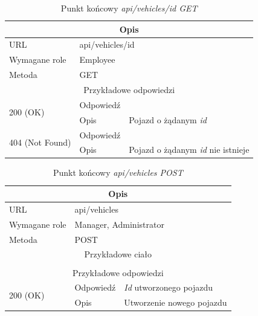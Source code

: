 \documentclass[eng,printmode,openany]{mgr}
\begin{document}
\begin{table}[H]
	\caption{Punkt końcowy \textit{api/vehicles/id GET}}
	\begin{tabularx}{\textwidth}{|l|l|X|}
		\hline
		\multicolumn{3}{|c|}{Opis}                         						\\ \hline
		URL                       & \multicolumn{2}{l|}{api/vehicles/id} 		\\ \hline
		Wymagane role             & \multicolumn{2}{l|}{Employee} 				\\ \hline
		Metoda                    & \multicolumn{2}{l|}{GET} 					\\ \hline
		\multicolumn{3}{|c|}{ Przykładowe odpowiedzi}                   		\\ \hline
		\multirow{2}{*}{200 (OK)} 			& Odpowiedź    	&        \\ \cline{2-3} 
		& Opis         	& Pojazd o żądanym \textit{id}      									\\ \hline
		\multirow{2}{*}{404 (Not Found)} 	& Odpowiedź     &    \\ \cline{2-3} 
		& Opis          & Pojazd o żądanym \textit{id} nie istnieje      						\\ \hline
	\end{tabularx}
\end{table}

\begin{table}[H]
	\caption{Punkt końcowy \textit{api/vehicles POST}}
	\begin{tabularx}{\textwidth}{|l|l|X|}
		\hline
		\multicolumn{3}{|c|}{Opis}                         						\\ \hline
		URL                       & \multicolumn{2}{l|}{api/vehicles} 			\\ \hline
		Wymagane role             & \multicolumn{2}{l|}{Manager, Administrator} \\ \hline
		Metoda                    & \multicolumn{2}{l|}{POST} 					\\ \hline
		\multicolumn{3}{|c|}{Przykładowe ciało}         						\\ \hline
		\multicolumn{3}{|c|}{} 		\\ \hline
		\multicolumn{3}{|c|}{ Przykładowe odpowiedzi}                   						\\ \hline
		\multirow{2}{*}{200 (OK)} 			& Odpowiedź     &  \textit{Id} utworzonego pojazdu  \\ \cline{2-3} 
		& Opis         	& Utworzenie nowego pojazdu   		\\ \hline
	\end{tabularx}
\end{table}
\end{document}
